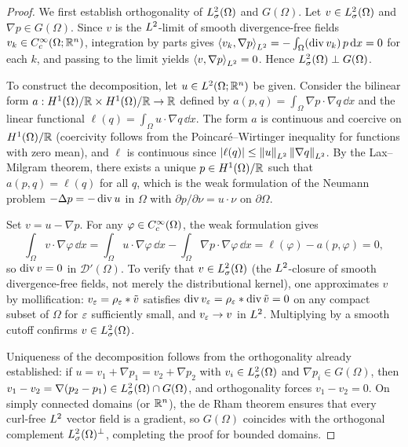 \begin{proof}
  We first establish orthogonality of $L^{2}_\sigma(\Omega)$ and $G(\Omega)$.  Let $v \in
  L^{2}_\sigma(\Omega)$ and $\nabla p \in G(\Omega)$.  Since $v$ is the $L^{2}$-limit of
  smooth divergence-free fields $v_{k} \in C^\infty_c(\Omega;\mathbb{R}^{n})$, integration by parts
  gives $\left\langle v_{k}, \nabla p \right\rangle_{L^{2}} = -\int_{\Omega} (\operatorname{div} v_{k})\,p\,\mathrm{d} x
  = 0$ for each $k$, and passing to the limit yields $\left\langle v, \nabla p \right\rangle_{L^{2}} = 0$.
  Hence $L^{2}_\sigma(\Omega) \perp G(\Omega)$.

  To construct the decomposition, let $u \in L^{2}(\Omega;\mathbb{R}^{n})$ be given.  Consider
  the bilinear form $a : H^{1}(\Omega)/\mathbb{R} \times H^{1}(\Omega)/\mathbb{R} \to \mathbb{R}$ defined by
  $a(p, q) = \int_{\Omega} \nabla p \cdot \nabla q\,\dd x$ and the linear functional
  $\ell(q) = \int_{\Omega} u \cdot \nabla q\,\dd x$.  The form $a$ is continuous and
  coercive on $H^{1}(\Omega)/\mathbb{R}$ (coercivity follows from the Poincar\'{e}--Wirtinger
  inequality for functions with zero mean), and $\ell$ is continuous since
  $\left\lvert \ell(q) \right\rvert \le \left\lVert u \right\rVert_{L^{2}}\left\lVert \nabla q \right\rVert_{L^{2}}$.  By the Lax--Milgram
  theorem, there exists a unique $p \in H^{1}(\Omega)/\mathbb{R}$ such that
  $a(p, q) = \ell(q)$ for all $q$, which is the weak formulation of the Neumann problem
  $-\Delta p = -\operatorname{div} u$ in $\Omega$ with $\partial p / \partial \nu = u \cdot \nu$
  on $\partial\Omega$.

  Set $v = u - \nabla p$.  For any $\varphi \in C^\infty_c(\Omega)$, the weak formulation
  gives 
  $$\int_{\Omega} v \cdot \nabla \varphi\,\dd x = \int_{\Omega} u \cdot \nabla
  \varphi\,\dd x - \int_{\Omega} \nabla p \cdot \nabla \varphi\,\dd x = \ell(\varphi)
  - a(p, \varphi) = 0,$$
  so $\operatorname{div} v = 0$ in $\mathcal{D}'(\Omega)$.  To verify
  that $v \in L^{2}_\sigma(\Omega)$ (the $L^{2}$-closure of smooth divergence-free fields,
  not merely the distributional kernel), one approximates $v$ by mollification:
  $v_{\varepsilon} = \rho_{\varepsilon} * \tilde{v}$ satisfies $\operatorname{div} v_{\varepsilon} = \rho_{\varepsilon} *
  \operatorname{div} \tilde{v} = 0$ on any compact subset of $\Omega$ for $\varepsilon$ sufficiently
  small, and $v_{\varepsilon} \to v$ in $L^{2}$.  Multiplying by a smooth cutoff confirms
  $v \in L^{2}_\sigma(\Omega)$.

  Uniqueness of the decomposition follows from the orthogonality already established: if
  $u = v_{1} + \nabla p_{1} = v_{2} + \nabla p_{2}$ with $v_{i} \in L^{2}_\sigma(\Omega)$ and
  $\nabla p_{i} \in G(\Omega)$, then $v_{1} - v_{2} = \nabla(p_{2} - p_{1}) \in
  L^{2}_\sigma(\Omega) \cap G(\Omega)$, and orthogonality forces $v_{1} - v_{2} = 0$.  On
  simply connected domains (or $\mathbb{R}^{n}$), the de Rham theorem ensures that every
  curl-free $L^{2}$ vector field is a gradient, so $G(\Omega)$ coincides with the
  orthogonal complement $L^{2}_\sigma(\Omega)^{\perp}$, completing the proof for bounded domains.


\end{proof}
